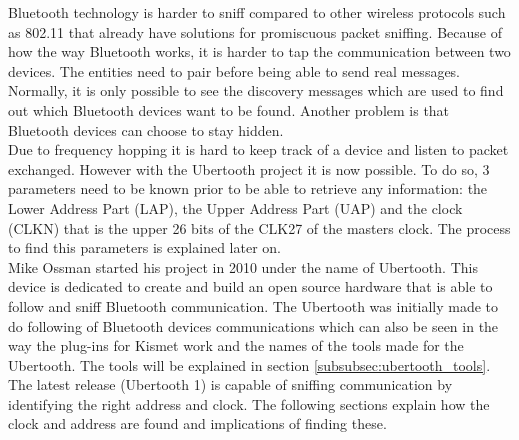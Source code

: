 \label{subsubsec:ubertooth}
Bluetooth technology is harder to sniff compared to other wireless protocols such as 802.11 that already have solutions for promiscuous packet sniffing. Because of how the way Bluetooth works, it is harder to tap the communication between two devices. The entities need to pair before being able to send real messages. Normally, it is only possible to see the discovery messages which are used to find out which Bluetooth devices want to be found. Another problem is that Bluetooth devices can choose to stay hidden. \\
Due to frequency hopping it is hard to keep track of a device and listen to packet exchanged. However with the Ubertooth project it is now possible. To do so, 3 parameters need to be known prior to be able to retrieve any information: the Lower Address Part (LAP), the Upper Address Part (UAP) and the clock (CLKN) that is the upper 26 bits of the CLK27 of the masters clock. The process to find this parameters is explained later on.
\\
Mike Ossman started his project in 2010 under the name of Ubertooth. This device is dedicated to create and build an open source hardware that is able to follow and sniff Bluetooth communication. The Ubertooth was initially made to do following of Bluetooth devices communications which can also be seen in the way the plug-ins for Kismet work and the names of the tools made for the Ubertooth. The tools will be explained in section \ref{subsubsec:ubertooth_tools}. The latest release (Ubertooth 1) is capable of sniffing communication by identifying the right address and clock. The following sections explain how the clock and address are found and implications of finding these.

